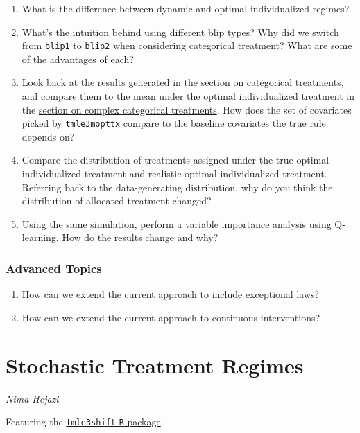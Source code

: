 \documentclass[
  12pt, krantz2,
]{krantz}
\newcommand{\passthrough}[1]{#1}
\newcommand{\1}{\mathbbm{1}}
\theoremstyle{definition}
\theoremstyle{definition}
\theoremstyle{definition}
\theoremstyle{definition}
\theoremstyle{remark}
\begin{document}
\begin{enumerate}
\def\labelenumi{\arabic{enumi}.}
\item
  What is the difference between dynamic and optimal individualized regimes?
\item
  What's the intuition behind using different blip types? Why did we switch
  from \passthrough{\lstinline!blip1!} to \passthrough{\lstinline!blip2!} when considering categorical treatment? What are some
  of the advantages of each?
\item
  Look back at the results generated in the \protect\hyperlink{oit-eval-cat-v1}{section on categorical
  treatments}, and compare them to the mean under the optimal
  individualized treatment in the \protect\hyperlink{oit-eval-bin-v2}{section on complex categorical
  treatments}. How does the set of covariates picked by \passthrough{\lstinline!tmle3mopttx!}
  compare to the baseline covariates the true rule depends on?
\item
  Compare the distribution of treatments assigned under the true optimal
  individualized treatment and realistic optimal individualized treatment.
  Referring back to the data-generating distribution, why do you think the
  distribution of allocated treatment changed?
\item
  Using the same simulation, perform a variable importance analysis using
  Q-learning. How do the results change and why?
\end{enumerate}

\hypertarget{advanced-topics-1}{%
\subsection{Advanced Topics}\label{advanced-topics-1}}

\begin{enumerate}
\def\labelenumi{\arabic{enumi}.}
\item
  How can we extend the current approach to include exceptional laws?
\item
  How can we extend the current approach to continuous interventions?
\end{enumerate}

\hypertarget{shift}{%
\chapter{Stochastic Treatment Regimes}\label{shift}}

\emph{Nima Hejazi}

Featuring the \href{https://github.com/tlverse/tmle3shift}{\passthrough{\lstinline!tmle3shift!} \passthrough{\lstinline!R!} package}.
\end{document}
